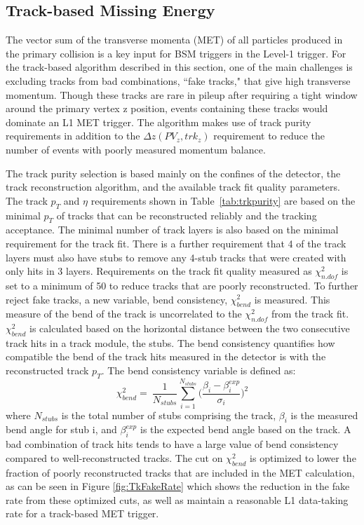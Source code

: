 \subsection{Track-based Missing Energy}
\label{sec:TkMET}

The vector sum of the transverse momenta (MET) of all particles produced in the primary collision is a key input for BSM triggers in the Level-1 trigger. For the track-based algorithm described in this section, one of the main challenges is excluding tracks from bad combinations, ``fake tracks," that give high transverse momentum. Though these tracks are rare in pileup after requiring a tight window around the primary vertex z position, events containing these tracks would dominate an L1 MET trigger. The algorithm makes use of track purity requirements in addition to the $\Delta z\left(PV_{z}, trk_{z}\right)$ requirement to reduce the number of events with poorly measured momentum balance.

The track purity selection is based mainly on the confines of the detector, the track reconstruction algorithm, and the available track fit quality parameters. The track $p_{T}$ and $\eta$ requirements shown in Table~\ref{tab:trkpurity} are based on the minimal $p_{T}$ of tracks that can be reconstructed reliably and the tracking acceptance. The minimal number of track layers is also based on the minimal requirement for the track fit. There is a further requirement that 4 of the track layers must also have stubs to remove any 4-stub tracks that were created with only hits in 3 layers. Requirements on the track fit quality measured as $\chi^{2}_{n.dof}$ is set to a minimum of 50 to reduce tracks that are poorly reconstructed. To further reject fake tracks, a new variable, bend consistency, $\chi^{2}_{bend}$ is measured. This measure of the bend of the track is uncorrelated to the $\chi^{2}_{n.dof}$ from the track fit. $\chi^{2}_{bend}$ is calculated based on the horizontal distance between the two consecutive track hits in a track module, the stubs. The bend consistency quantifies how compatible the bend of the track hits measured in the detector is with the reconstructed track $p_{T}$. The bend consistency variable is defined as:
\begin{equation}
\chi^{2}_{bend} =~ \frac{1}{N_{stubs}} \sum_{i=1}^{N_{stubs}}\Big(\frac{\beta_i - \beta_i^{exp}}{\sigma_{i}}\Big)^2
\end{equation}
where $N_{stubs}$ is the total number of stubs comprising the track, $\beta_{i}$ is the measured bend angle for stub i, and $\beta_i^{exp}$ is the expected bend angle based on the track. A bad combination of track hits tends to have a large value of bend consistency compared to well-reconstructed tracks. The cut on $\chi^{2}_{bend}$ is optimized to lower the fraction of poorly reconstructed tracks that are included in the MET calculation, as can be seen in Figure \ref{fig:TkFakeRate} which shows the reduction in the fake rate from these optimized cuts, as well as maintain a reasonable L1 data-taking rate for a track-based MET trigger.


